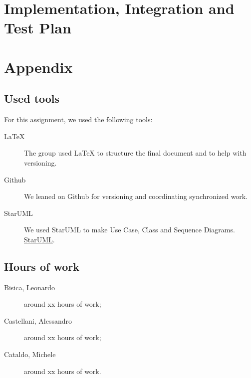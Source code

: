 \documentclass[12pt, a4paper]{article}
\begin{document}
	\newpage
	\section{Implementation, Integration and Test Plan}

	\newpage	
	\section{Appendix}
		\listoffigures
		\listoftables
		\listofalgorithms
		
		\subsection{Used tools}
		For this assignment, we used the following tools:
		
		\begin{description}
			\item [LaTeX] The group used LaTeX to structure the final document and to help with versioning.
			\item [Github] We leaned on Github for versioning and coordinating synchronized work.
			\item[StarUML] We used StarUML  to make Use Case, Class and Sequence Diagrams. \href{http://staruml.io/}{StarUML}.
			
		\end{description}
		
		\subsection{Hours of work}
			\begin{description}
				\item[Bisica, Leonardo] around xx hours of work;
				\item[Castellani, Alessandro] around xx hours of work;
				\item[Cataldo, Michele] around xx hours of work.
			\end{description}
			
\end{document}
